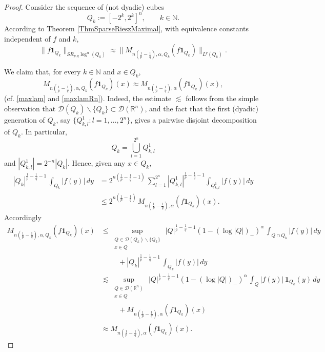 \documentclass[11pt, a4paper,leqno]{amsart}
\theoremstyle{plain}
\numberwithin{equation}{section}
\theoremstyle{definition}
\theoremstyle{remark}
\begin{document}
\begin{proof}
Consider the sequence of (not dyadic) cubes
\[
Q_{k} := [-2^{k}, 2^{k}]^{n}, \qquad k \in\mathbb{N}.
\]
According to Theorem \ref{ThmSparseRieszMaximal}, with equivalence constants
independent of $f$ and $k$,
\begin{equation}
\label{FatouMax0}\|f \mathbf{1}_{Q_{k}}\|_{SR_{p, q} \log^{\alpha}(Q_{k})}
\approx\|M_{n (\frac{1}{p} -\frac{1}{q}), \alpha, Q_{k}} (f \mathbf{1}_{Q_{k}%
})\|_{L^{q}(Q_{k})}.
\end{equation}


We claim that, for every $k\in\mathbb{N}$ and $x\in Q_{k}$,
\begin{equation}
M_{n(\frac{1}{p}-\frac{1}{q}),\alpha,Q_{k}}(f\mathbf{1}_{Q_{k}})(x)\approx
M_{n(\frac{1}{p}-\frac{1}{q}),\alpha}(f\mathbf{1}_{Q_{k}})(x),
\label{CorSparSobProof1}%
\end{equation}
(cf. \eqref{maxlam} and \eqref{maxlamRn}). Indeed, the estimate $\lesssim$
follows from the simple observation that $\mathcal{D}(Q_{k})\backslash
\{Q_{k}\}\subset\mathcal{D}(\mathbb{R}^{n})$, and the fact that the first
(dyadic) generation of $Q_{k}$, say $\{Q_{k,l}^{1}:l=1,\ldots,2^{n}\}$, gives
a pairwise disjoint decomposition of $Q_{k}$. In particular,
\[
Q_{k}=\bigcup_{l=1}^{2^{n}}Q_{k,l}^{1}%
\]
and $|Q_{k,l}^{1}|=2^{-n}|Q_{k}|$. Hence, given any $x\in Q_{k}$,
\begin{align*}
|Q_{k}|^{\frac{1}{p}-\frac{1}{q}-1}\,\int_{Q_{k}}|f(y)|\,dy  &  =2^{n(\frac
{1}{p}-\frac{1}{q}-1)}\,\sum_{l=1}^{2^{n}}|Q_{k,l}^{1}|^{\frac{1}{p}-\frac
{1}{q}-1}\int_{Q_{k,l}^{1}}|f(y)|\,dy\\
&  \leq2^{n(\frac{1}{p}-\frac{1}{q})}\,M_{n(\frac{1}{p}-\frac{1}{q}),\alpha
}(f\mathbf{1}_{Q_{k}})(x).
\end{align*}
Accordingly
\begin{align*}
M_{n(\frac{1}{p}-\frac{1}{q}),\alpha,Q_{k}}(f\mathbf{1}_{Q_{k}})(x)  &
\leq\sup_{\substack{Q\in\mathcal{D}(Q_{k})\backslash\{Q_{k}\}\\x\in
Q}}\,|Q|^{\frac{1}{p}-\frac{1}{q}-1}(1-(\log|Q|)_{-})^{\alpha}\,\int_{Q\cap
Q_{k}}|f(y)|\,dy\\
&  \hspace{1cm}+|Q_{k}|^{\frac{1}{p}-\frac{1}{q}-1}\,\int_{Q_{k}}|f(y)|\,dy\\
&  \lesssim\sup_{\substack{Q\in\mathcal{D}(\mathbb{R}^{n})\\x\in Q}%
}\,|Q|^{\frac{1}{p}-\frac{1}{q}-1}(1-(\log|Q|)_{-})^{\alpha}\,\int%
_{Q}|f(y)|\,\mathbf{1}_{Q_{k}}(y)\,dy\\
&  \hspace{1cm}+M_{n(\frac{1}{p}-\frac{1}{q}),\alpha}(f\mathbf{1}_{Q_{k}%
})(x)\\
&  \approx M_{n(\frac{1}{p}-\frac{1}{q}),\alpha}(f\mathbf{1}_{Q_{k}})(x).
\end{align*}



\end{proof}
\end{document}
